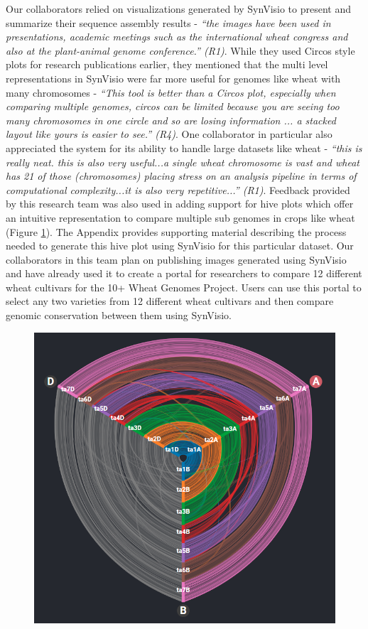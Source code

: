 Our collaborators relied on visualizations generated by SynVisio to present and summarize their sequence assembly results - \textit{``the images have been used in presentations, academic meetings such as the international wheat congress and also at the plant-animal genome conference.'' (R1)}. While they used Circos style plots for research publications earlier, they mentioned that the multi level representations in SynVisio were far more useful for genomes like wheat with many chromosomes - \textit{``This tool is better than a Circos plot, especially when comparing multiple genomes, circos can be limited because you are seeing too many chromosomes in one circle and so are losing information ... a stacked layout like yours is easier to see.'' (R4)}. One collaborator in particular also appreciated the system for its ability to handle large datasets like wheat - \textit{``this is really neat. this is also very useful...a single wheat chromosome is vast and wheat has 21 of those (chromosomes) placing stress on an analysis pipeline in terms of computational complexity...it is also very repetitive...'' (R1)}.
Feedback provided by this research team was also used in adding support for hive plots which offer an intuitive representation to compare multiple sub genomes in crops like wheat (Figure \ref{fig:ch_6_wheat}). The Appendix provides supporting material describing the process needed to generate this hive plot using SynVisio for this particular dataset. Our collaborators in this team plan on publishing images generated using SynVisio and have already used it to create a portal for researchers to compare 12 different wheat cultivars for the 10+ Wheat Genomes Project. Users can use this portal to select any two varieties from 12 different wheat cultivars and then compare genomic conservation between them using SynVisio\cite{10wheat,wheatinfogithub}.

\begin{figure}
  \centering
  \includegraphics[width=0.65\linewidth]{images/ch_6_wheat.PNG}
  \label{fig:ch_6_wheat}
\end{figure}


